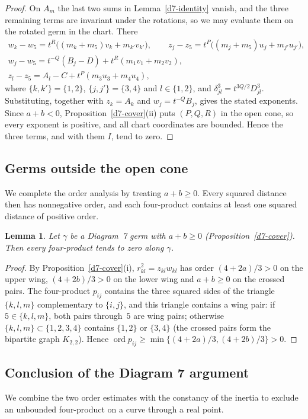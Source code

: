 \documentclass[Threeside,11pt]{article}
\newtheorem{lemma}[theorem]{Lemma}
\theoremstyle{definition}
\theoremstyle{remark}
\numberwithin{equation}{section}
\theoremstyle{remark}
\newcommand{\ord}{\operatorname{ord}}
\begin{document}
\begin{proof}
On $A_m$ the last two sums in Lemma~\ref{d7-identity} vanish, and the three remaining terms are
invariant under the rotations, so we may evaluate them on the rotated germ in the chart.  There
\begin{gather*}
  w_k-w_5=t^R\bigl((m_k+m_5)v_k+m_{k'}v_{k'}\bigr),\qquad
  z_j-z_5=t^P\bigl((m_j+m_5)u_j+m_{j'}u_{j'}\bigr),\\
  w_j-w_5=t^{-Q}(B_j-D)+t^R(m_1v_1+m_2v_2),\\
  z_l-z_5=A_l-C+t^P(m_3u_3+m_4u_4),
\end{gather*}
where $\{k,k'\}=\{1,2\}$, $\{j,j'\}=\{3,4\}$ and $l\in\{1,2\}$, and
$\delta_{jl}^3=t^{3Q/2}D_{jl}^3$.  Substituting, together with $z_k=A_k$ and $w_j=t^{-Q}B_j$,
gives the stated exponents.  Since $a+b<0$, Proposition~\ref{d7-cover}(ii) puts $(P,Q,R)$ in the
open cone, so every exponent is positive, and all chart coordinates are bounded.  Hence the three
terms, and with them $I$, tend to zero.
\end{proof}

\subsection{Germs outside the open cone}
We complete the order analysis by treating $a+b\ge0$.
Every squared distance then has nonnegative order, and each four-product
contains at least one squared distance of positive order.

\begin{lemma}\label{d7-bounded}
Let $\gamma$ be a Diagram~7 germ with $a+b\ge0$ (Proposition~\ref{d7-cover}).  Then every
four-product tends to zero along $\gamma$.
\end{lemma}

\begin{proof}
By Proposition~\ref{d7-cover}(i), $r_{kl}^2=z_{kl}w_{kl}$ has order $(4+2a)/3>0$ on the upper
wing, $(4+2b)/3>0$ on the lower wing and $a+b\ge0$ on the crossed pairs.  The four-product
$p_{ij}$ contains the three squared sides of the triangle $\{k,l,m\}$ complementary to
$\{i,j\}$, and this triangle contains a wing pair: if $5\in\{k,l,m\}$, both pairs through~$5$
are wing pairs; otherwise $\{k,l,m\}\subset\{1,2,3,4\}$ contains $\{1,2\}$ or $\{3,4\}$ (the
crossed pairs form the bipartite graph $K_{2,2}$).  Hence
$\ord p_{ij}\ge\min\{(4+2a)/3,(4+2b)/3\}>0$.
\end{proof}



\subsection{Conclusion of the Diagram 7 argument}
We combine the two order estimates with the constancy of the inertia to
exclude an unbounded four-product on a curve through a real point.
\end{document}
